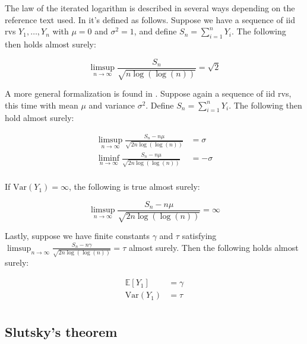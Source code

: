 \documentclass{report}
\begin{document}
The law of the iterated logarithm is described in several ways depending on the reference text used. In \cite[Chapter~2.7]{van_der_vaart_asymptotic_1998} it's defined as follows. Suppose we have a sequence of \gls{iid} \glspl{rv} $Y_1, \dots, Y_n$ with $\mu = 0$ and $\sigma^2 = 1$, and define $S_n = \sum_{i=1}^n Y_i$. The following then holds almost surely:

\begin{equation}\label{eq:lst-iterated-logarithm-1}
    \limsup_{n\to\infty} \frac{S_n}{\sqrt{n\log(\log(n))}} = \sqrt{2}
\end{equation}

A more general formalization is found in \cite[Chapter~1.3]{dasgupta_asymptotic_2008}. Suppose again a sequence of \gls{iid} \glspl{rv}, this time with mean $\mu$ and variance $\sigma^2$. Define $S_n = \sum_{i=1}^n Y_i$. The following then hold almost surely:

\begin{equation}\label{eq:lst-iterated-logarithm-2}
    \begin{aligned}
        \limsup_{n\to\infty} \frac{S_n - n\mu}{\sqrt{2n\log(\log(n))}} &= \sigma \\
        \liminf_{n\to\infty} \frac{S_n - n\mu}{\sqrt{2n\log(\log(n))}} &= -\sigma \\
    \end{aligned}
\end{equation}

If $\text{Var}(Y_1) = \infty$, the following is true almost surely:

\begin{equation}\label{eq:lst-iterated-logarithm-3}
    \limsup_{n\to\infty} \frac{S_n - n\mu}{\sqrt{2n\log(\log(n))}} = \infty
\end{equation}

Lastly, suppose we have finite constants $\gamma$ and $\tau$ satisfying $\limsup_{n\to\infty} \frac{S_n - n\gamma}{\sqrt{2n\log(\log(n))}} = \tau$ almost surely. Then the following holds almost surely:

\begin{equation}\label{eq:lst-iterated-logarithm-4}
    \begin{aligned}
        \mathbb{E}[Y_1] &= \gamma \\
        \text{Var}(Y_1) &= \tau \\
    \end{aligned}
\end{equation}

\subsection{Slutsky's theorem}
\end{document}
